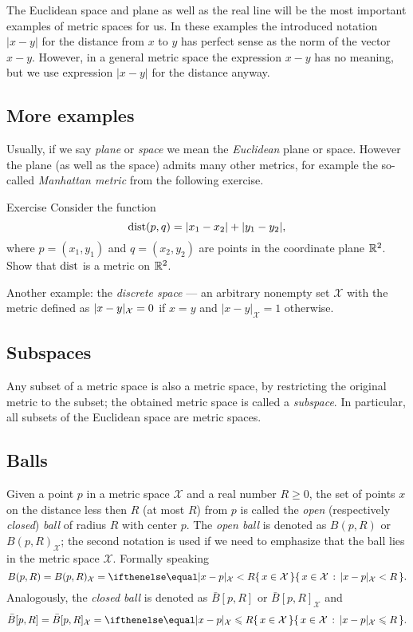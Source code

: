 The Euclidean space and plane as well as the real line will be the most important examples of metric spaces for us.
In these examples the introduced notation $|x-y|$ for the distance from $x$ to $y$ has perfect sense as the norm of the vector $x-y$.
However, in a general metric space the expression $x-y$ has no meaning, but we use expression $|x-y|$ for the distance anyway.

\subsection*{More examples}

Usually, if we say {}\emph{plane} or {}\emph{space} we mean the {}\emph{Euclidean} plane or space.
However the plane (as well as the space) admits many other metrics, for example the so-called \emph{Manhattan metric} from the following exercise.

\begin{thm}{Exercise}\label{ex:ell-infty}
Consider the function
$$\mathop{\rm dist}\nolimits(p,q)=|x_1-x_2|+|y_1-y_2|,$$
where $p=(x_1,y_1)$ and $q=(x_2,y_2)$ are points in the coordinate plane $\mathbb{R}^2$.
Show that $\mathop{\rm dist}\nolimits$ is a metric on $\mathbb{R}^2$.
\end{thm}

Another example: the \emph{discrete space} --- an arbitrary nonempty set $\mathcal X$ with the metric defined as $|x\z-y|_{\mathcal X}=0$ if $x=y$ and $|x-y|_{\mathcal X}=1$ otherwise.

\subsection*{Subspaces}
Any subset of a metric space is also a metric space, by restricting the original metric to the subset;
the obtained metric space is called a \emph{subspace}.
In particular, all subsets of the Euclidean space are metric spaces.

\subsection*{Balls}
Given a point $p$ in a metric space ${\mathcal X}$ and a real number $R\ge 0$, the set of points $x$ on the distance less then $R$ (at most $R$) from $p$ is called the \emph{open} (respectively \emph{closed}) \emph{ball} of radius $R$ with center $p$.
The {}\emph{open ball} is denoted as $B(p,R)$ or $B(p,R)_{\mathcal X}$;
the second notation is used if we need to emphasize that the ball lies in the metric space $\mathcal X$.
Formally speaking
\[B(p,R)=B(p,R)_{\mathcal X}=\set{x\in \mathcal X}{|x-p|_{\mathcal X}< R}.\]
Analogously, the {}\emph{closed ball} is denoted as $\bar B[p,R]$ or $\bar B[p,R]_{\mathcal X}$ and
\[\bar B[p,R]=\bar B[p,R]_{\mathcal X}=\set{x\in \mathcal X}{|x-p|_{\mathcal X}\le R}.\]

